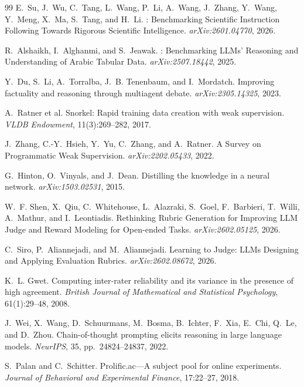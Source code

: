 \documentclass[11pt]{article}
\begin{document}
\begin{thebibliography}{99}
E.~Su, J.~Wu, C.~Tang, L.~Wang, P.~Li, A.~Wang, J.~Zhang, Y.~Wang, Y.~Meng,
X.~Ma, S.~Tang, and H.~Li.
: Benchmarking Scientific Instruction Following Towards
Rigorous Scientific Intelligence.
\newblock \emph{arXiv:2601.04770}, 2026.

R.~Alshaikh, I.~Alghanmi, and S.~Jeawak.
: Benchmarking {LLM}s' Reasoning and Understanding of
{A}rabic Tabular Data.
\newblock \emph{arXiv:2507.18442}, 2025.

Y.~Du, S.~Li, A.~Torralba, J.~B. Tenenbaum, and I.~Mordatch.
\newblock Improving factuality and reasoning through multiagent debate.
\newblock \emph{arXiv:2305.14325}, 2023.

A.~Ratner et al.
\newblock Snorkel: Rapid training data creation with weak supervision.
\newblock \emph{VLDB Endowment}, 11(3):269--282, 2017.

J.~Zhang, C.-Y.~Hsieh, Y.~Yu, C.~Zhang, and A.~Ratner.
\newblock A Survey on Programmatic Weak Supervision.
\newblock \emph{arXiv:2202.05433}, 2022.

G.~Hinton, O.~Vinyals, and J.~Dean.
\newblock Distilling the knowledge in a neural network.
\newblock \emph{arXiv:1503.02531}, 2015.

W.~F. Shen, X.~Qiu, C.~Whitehouse, L.~Alazraki, S.~Goel, F.~Barbieri,
T.~Willi, A.~Mathur, and I.~Leontiadis.
\newblock Rethinking Rubric Generation for Improving {LLM} Judge and Reward
Modeling for Open-ended Tasks.
\newblock \emph{arXiv:2602.05125}, 2026.

C.~Siro, P.~Aliannejadi, and M.~Aliannejadi.
\newblock Learning to Judge: {LLM}s Designing and Applying Evaluation Rubrics.
\newblock \emph{arXiv:2602.08672}, 2026.

K.~L. Gwet.
\newblock Computing inter-rater reliability and its variance in the presence of
high agreement.
\newblock \emph{British Journal of Mathematical and Statistical Psychology},
61(1):29--48, 2008.

J.~Wei, X.~Wang, D.~Schuurmans, M.~Bosma, B.~Ichter, F.~Xia, E.~Chi,
Q.~Le, and D.~Zhou.
\newblock Chain-of-thought prompting elicits reasoning in large language
models.
\newblock \emph{NeurIPS}, 35, pp.\ 24824--24837, 2022.

S.~Palan and C.~Schitter.
\newblock Prolific.ac---A subject pool for online experiments.
\newblock \emph{Journal of Behavioral and Experimental Finance},
17:22--27, 2018.


\end{thebibliography}
\end{document}
